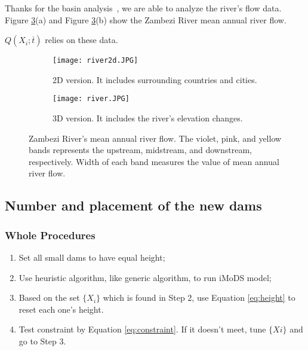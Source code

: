 \documentclass{mcmthesis}
\begin{document}
Thanks for the basin analysis~\cite{WB_Basin}, we are able to analyze the river's flow data. Figure \ref{fig:flow}(a) and Figure \ref{fig:flow}(b) show the Zambezi River mean annual river flow.

$Q(X_i;\overline{t})$ relies on these data.

\begin{figure}[h]
    \centering
    \begin{subfigure}[b]{0.5\textwidth}
        \texttt{[image: river2d.JPG]}
        \caption{2D version. It includes surrounding countries and cities.}
        \label{fig:flow2d}
    \end{subfigure}%
    \begin{subfigure}[b]{0.5\textwidth}
        \texttt{[image: river.JPG]}
        \caption{3D version. It includes the river's elevation changes.}
        \label{fig:flow3d}
    \end{subfigure}
    \caption{Zambezi River's mean annual river flow. The violet, pink, and yellow bands represents the upstream, midstream, and downstream, respectively. Width of each band measures the value of mean annual river flow.}\label{fig:flow}
\end{figure}
\subsection{Number and placement of the new dams}
\subsubsection{Whole Procedures}
\begin{enumerate}
\item Set all small dams to have equal height;
\item Use heuristic algorithm, like generic algorithm, to run iMoDS model;
\item Based on the set $\{X_i\}$ which is found in Step 2, use Equation \eqref{eq:height} to reset each one's height.
\item Test constraint by Equation \eqref{eq:constraint}. If it doesn't meet, tune $\{Xi\}$ and go to Step 3.
\end{enumerate}
\end{document}
